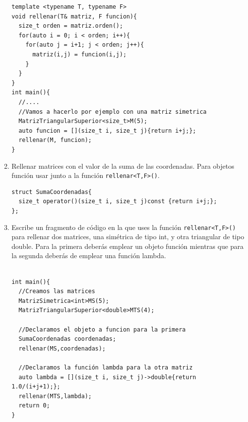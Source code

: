 \begin{enumerate}[label=\alph*)]
\begin{verbatim}
template <typename T, typename F>
void rellenar(T& matriz, F funcion){
  size_t orden = matriz.orden();
  for(auto i = 0; i < orden; i++){
    for(auto j = i+1; j < orden; j++){
      matriz(i,j) = funcion(i,j);
    }
  }
}
int main(){
  //....
  //Vamos a hacerlo por ejemplo con una matriz simetrica
  MatrizTriangularSuperior<size_t>M(5);
  auto funcion = [](size_t i, size_t j){return i+j;};
  rellenar(M, funcion);
}
\end{verbatim}
  \item Rellenar matrices con el valor de la suma de las coordenadas. Para objetos función usar junto a la función \texttt{rellenar<T,F>()}.
\begin{verbatim}
struct SumaCoordenadas{
  size_t operator()(size_t i, size_t j)const {return i+j;};
};
\end{verbatim}
  \item Escribe un fragmento de código en la que uses la función \texttt{rellenar<T,F>()} para rellenar dos matrices, una simétrica de tipo int, y otra triangular de tipo double. Para la primera deberás emplear un objeto función mientras que para la segunda deberás de emplear una función lambda.
\begin{verbatim}
  
int main(){
  //Creamos las matrices
  MatrizSimetrica<int>MS(5);
  MatrizTriangularSuperior<double>MTS(4);

  //Declaramos el objeto a funcion para la primera
  SumaCoordenadas coordenadas;
  rellenar(MS,coordenadas);

  //Declaramos la función lambda para la otra matriz
  auto lambda = [](size_t i, size_t j)->double{return 1.0/(i+j+1);};
  rellenar(MTS,lambda);
  return 0;
}
\end{verbatim}
\end{enumerate}

